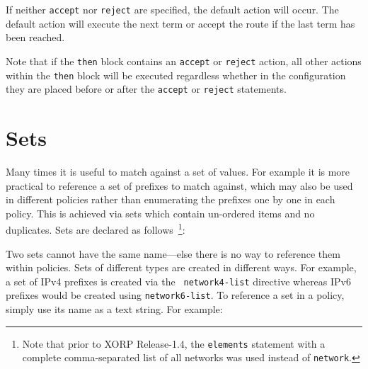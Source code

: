 If neither {\tt accept} nor {\tt reject} are specified, the default action will
occur.  The default action will execute the next term or accept the route if the
last term has been reached.

Note that if the {\tt then} block contains an {\tt accept} or {\tt reject}
action, all other actions within the {\tt then} block will be executed
regardless whether in the configuration they are placed before or after
the {\tt accept} or {\tt reject} statements.

\newpage

\section{Sets}
Many times it is useful to match against a set of values.  For example it is
more practical to reference a set of prefixes to match against, which may also
be used in different policies rather than enumerating the prefixes one by one in
each policy.  This is achieved via sets which contain un-ordered items and no
duplicates.  Sets are declared as follows~\footnote{Note that prior to XORP
Release-1.4, the {\tt elements} statement with a complete comma-separated
list of all networks was used instead of {\tt network}.}:

\noindent{}

Two sets cannot have the same name---else there is no way to reference
them within policies.  Sets of different types are created in different
ways.  For example, a set of IPv4 prefixes is created via the {\tt
network4-list} directive whereas IPv6 prefixes would be created using
{\tt network6-list}.  To reference a set in a policy, simply use its
name as a text string.  For example:

